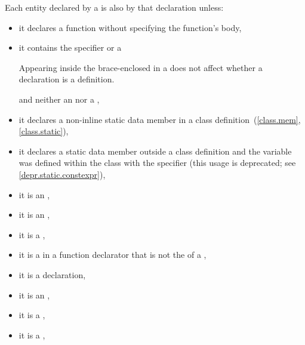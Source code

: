 \pnum
{}%
%
Each entity declared by a  is
also  by that declaration unless:
\begin{itemize}
\item
it declares a function
without specifying the function's body,
\item
it contains
the
%
 specifier or a
\begin{footnote}
Appearing inside the brace-enclosed
 in a  does
not affect whether a declaration is a definition.
\end{footnote}
and neither an  nor a
,
\item
{}%
it declares a non-inline static data member in a class
definition~(\ref{class.mem}, \ref{class.static}),
\item
it declares a static data member outside a class definition
and the variable was defined within the class with the 
specifier (this usage is deprecated; see \ref{depr.static.constexpr}),
\item
{}%
it is an ,
\item
it is an
%
,
\item
it is a
%
,
\item
it is a
%
 in a function
%
declarator that is not the  of a
,
\item
it is a
%
 declaration,
\item it is
an ,
\item it is
a
,
\item it is
a ,

\end{itemize}
